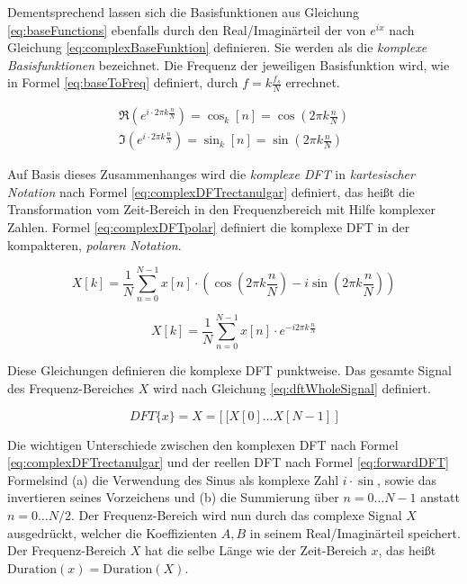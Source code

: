 Dementsprechend lassen sich die Basisfunktionen aus Gleichung \ref{eq:baseFunctions} ebenfalls durch den Real/Imaginärteil der von $e^{ix}$ nach Gleichung \ref{eq:complexBaseFunktion} definieren. Sie werden als die \emph{komplexe Basisfunktionen} bezeichnet. Die Frequenz der jeweiligen Basisfunktion wird, wie in Formel \ref{eq:baseToFreq} definiert, durch  $f = k\frac{f_s}{N}$ errechnet. 

\begin{equation}
\begin{gathered}
\Re(e^{i\cdot 2\pi k \frac{n}{N}}) = \cos_k[n] = \cos(2\pi k \frac{n}{N}) \\
\Im(e^{i\cdot 2\pi k \frac{n}{N}}) = \sin_k[n] = \sin(2\pi k \frac{n}{N})
\end{gathered}
\label{eq:complexBaseFunktion}
\end{equation}

Auf Basis dieses Zusammenhanges wird die \emph{komplexe DFT} in \emph{kartesischer Notation} nach Formel \ref{eq:complexDFTrectanulgar} definiert, das heißt die Transformation vom Zeit-Bereich in den Frequenzbereich mit Hilfe komplexer Zahlen. Formel \ref{eq:complexDFTpolar} definiert die komplexe DFT in der kompakteren, \emph{polaren Notation}. \cite[S. 570]{dspGuide}

\begin{equation}
\label{eq:complexDFTrectanulgar}
X[k] = \frac{1}{N} \sum_{n = 0}^{N-1}  x[n] \cdot (\cos (2\pi k \frac{n}{N}) -i \sin (2 \pi k \frac{n}{N}) )
\end{equation}

\begin{equation}
\label{eq:complexDFTpolar}
X[k] =  \frac{1}{N} \sum_{n = 0}^{N-1}  x[n] \cdot e^{-i 2\pi k \frac{n}{N}}
\end{equation}

Diese Gleichungen definieren die komplexe DFT punktweise. Das gesamte Signal des Frequenz-Bereiches $X$ wird nach Gleichung \ref{eq:dftWholeSignal} definiert.

\begin{equation}
DFT\{x\} = X = \big[ \: [ X[0] \ldots X[N-1] \: \big]
\label{eq:dftWholeSignal}
\end{equation}

Die wichtigen Unterschiede zwischen den komplexen DFT nach Formel  \ref{eq:complexDFTrectanulgar} und der reellen DFT nach Formel \ref{eq:forwardDFT} Formelsind (a) die Verwendung des Sinus als komplexe Zahl $i \cdot \sin$, sowie das invertieren seines Vorzeichens und (b) die Summierung über $n = 0\ldots N-1 $ anstatt $n = 0 \ldots N/2$. Der Frequenz-Bereich wird nun durch das complexe Signal $X$ ausgedrückt, welcher die Koeffizienten $A,B$ in seinem Real/Imaginärteil speichert. Der Frequenz-Bereich $X$ hat die selbe Länge wie der Zeit-Bereich $x$, das heißt $\text{Duration}(x) = \text{Duration}(X)$. \cite[S. 571]{dspGuide}

